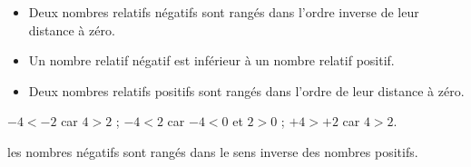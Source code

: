 \begin{propriete}
   \begin{itemize}
      \item Deux nombres relatifs négatifs sont rangés dans l'ordre inverse de leur
distance à zéro.
      \item Un nombre relatif négatif est inférieur à un nombre relatif positif.
      \item Deux nombres relatifs positifs sont rangés dans l'ordre de leur distance à zéro. \\ [-8mm]
   \end{itemize}  
\end{propriete}

\begin{exemple*1}
   $-4<-2$ car $4>2$ \qquad ; \quad $-4<2$ car $-4<0$ et $2>0$ \qquad ; \quad $+4>+2$ car $4>2$.
\end{exemple*1}

\medskip

\begin{remarque}
   les nombres négatifs sont rangés \og dans le sens inverse \fg{} des nombres positifs.
\end{remarque}


\exercicesbase

